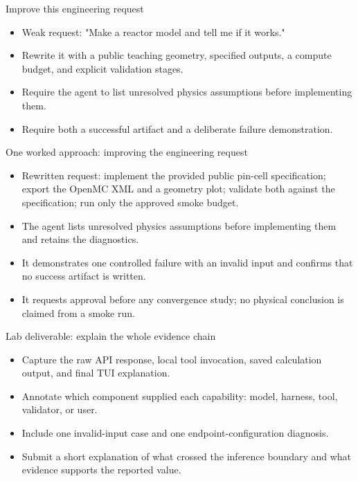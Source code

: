 \documentclass[aspectratio=169,11pt]{beamer}
\begin{document}
\begin{frame}[t,fragile]{Improve this engineering request}
\fontsize{11.5}{14}\selectfont
\begin{itemize}\setlength{\itemsep}{2mm}
\item Weak request: "Make a reactor model and tell me if it works."
\item Rewrite it with a public teaching geometry, specified outputs, a compute budget, and explicit validation stages.
\item Require the agent to list unresolved physics assumptions before implementing them.
\item Require both a successful artifact and a deliberate failure demonstration.
\end{itemize}
\end{frame}
\begin{frame}[t,fragile]{One worked approach: improving the engineering request}
\fontsize{11.5}{14}\selectfont
\begin{itemize}\setlength{\itemsep}{2mm}
\item Rewritten request: implement the provided public pin-cell specification; export the OpenMC XML and a geometry plot; validate both against the specification; run only the approved smoke budget.
\item The agent lists unresolved physics assumptions before implementing them and retains the diagnostics.
\item It demonstrates one controlled failure with an invalid input and confirms that no success artifact is written.
\item It requests approval before any convergence study; no physical conclusion is claimed from a smoke run.
\end{itemize}
\end{frame}
\begin{frame}[t,fragile]{Lab deliverable: explain the whole evidence chain}
\fontsize{11.5}{14}\selectfont
\begin{itemize}\setlength{\itemsep}{2mm}
\item Capture the raw API response, local tool invocation, saved calculation output, and final TUI explanation.
\item Annotate which component supplied each capability: model, harness, tool, validator, or user.
\item Include one invalid-input case and one endpoint-configuration diagnosis.
\item Submit a short explanation of what crossed the inference boundary and what evidence supports the reported value.
\end{itemize}
\end{frame}
\end{document}
